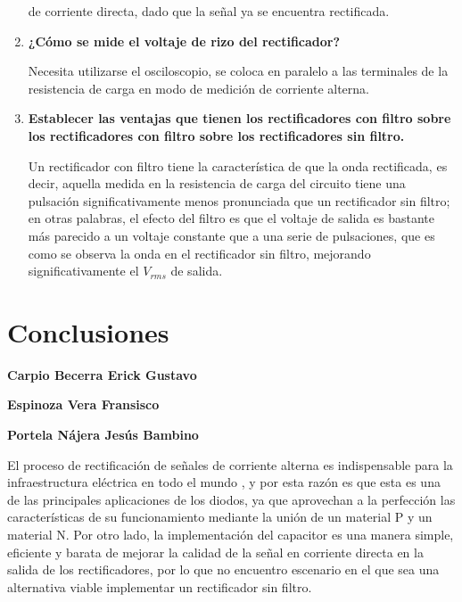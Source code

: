 \documentclass[12pt]{article}
\begin{document}
\begin{enumerate}
                de corriente directa, dado que la señal ya se encuentra rectificada.
            \item \textbf{¿Cómo se mide el voltaje de rizo del rectificador?}\par
                Necesita utilizarse el osciloscopio, se coloca en paralelo a las terminales de la resistencia de carga en modo de medición de corriente alterna.
            \item \textbf{Establecer las ventajas que tienen los rectificadores con filtro sobre los rectificadores con filtro sobre los rectificadores sin filtro.}\par    
                Un rectificador con filtro tiene la característica de que la onda rectificada, es decir, aquella medida en la resistencia de carga del circuito tiene una pulsación significativamente menos 
                pronunciada que un rectificador sin filtro; en otras palabras, el efecto del filtro es que el voltaje de salida es bastante más parecido a un voltaje constante que a una serie de pulsaciones, que 
                es como se observa la onda en el rectificador sin filtro, mejorando significativamente el $V_{rms}$ de salida.
        \end{enumerate}

        \section*{Conclusiones}
        \label{sec:conclusiones}
        \textbf{Carpio Becerra Erick Gustavo}\par
        \textbf{Espinoza Vera Fransisco}\par
        \textbf{Portela Nájera Jesús Bambino}\par
        El proceso de rectificación de señales de corriente alterna es indispensable para la infraestructura eléctrica en todo el mundo
        , y por esta razón es que esta es una de las principales aplicaciones de los diodos, ya que aprovechan a la perfección las características de su funcionamiento 
       mediante la unión de un material P y un material N. Por otro lado, la implementación del capacitor es una manera simple, eficiente y barata de mejorar la calidad
       de la señal en corriente directa en la salida de los rectificadores, por lo que no encuentro escenario en el que sea una alternativa viable implementar un rectificador 
       sin filtro.
\end{document}
